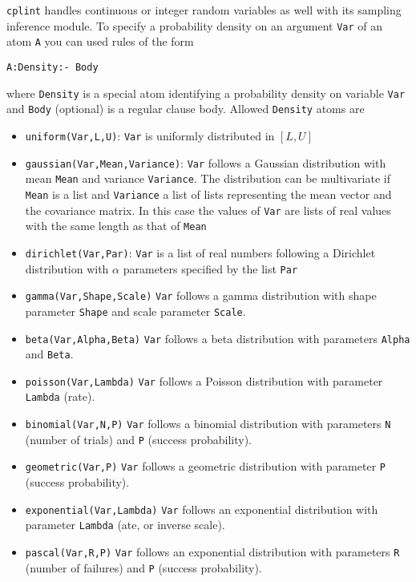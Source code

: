 \verb|cplint| handles continuous or integer random variables as well with its
sampling inference module.
To specify a probability density on an argument \verb|Var| of an atom
\verb|A| you can used rules of the form
\begin{verbatim}
A:Density:- Body
\end{verbatim}
where \verb|Density| is a special atom identifying a probability  density on variable \verb|Var| and \verb|Body| (optional) is a regular clause body.
Allowed \verb|Density| atoms are
\begin{itemize}
\item \verb|uniform(Var,L,U)|: \verb|Var| is uniformly distributed in $[L,U]$
\item \verb|gaussian(Var,Mean,Variance)|: \verb|Var| follows a Gaussian distribution with mean \verb|Mean| and variance \verb|Variance|. The distribution can be multivariate if \verb|Mean| 
is a list and \verb|Variance| a list of lists representing the mean vector and the covariance matrix. In this case the values of \verb|Var| are lists of real values with the same length as
that of \verb|Mean|
\item \verb|dirichlet(Var,Par)|: \verb|Var| is a list of real
numbers following a Dirichlet distribution with $\alpha$ parameters specified
by the list \verb|Par|
\item \verb|gamma(Var,Shape,Scale)|  \verb|Var| follows a gamma distribution 
with shape parameter \verb|Shape| and scale parameter \verb|Scale|.
\item \verb|beta(Var,Alpha,Beta)|  \verb|Var| follows a beta distribution 
with parameters \verb|Alpha| and \verb|Beta|.
\item \verb|poisson(Var,Lambda)|  \verb|Var| follows a Poisson distribution 
with parameter \verb|Lambda| (rate).
\item \verb|binomial(Var,N,P)|  \verb|Var| follows a binomial distribution 
with parameters \verb|N| (number of trials) and \verb|P| (success probability).
\item \verb|geometric(Var,P)|  \verb|Var| follows a geometric distribution 
with parameter \verb|P| (success probability).
\item \verb|exponential(Var,Lambda)|  \verb|Var| follows an exponential distribution 
with parameter \verb|Lambda| (ate, or inverse scale).
\item \verb|pascal(Var,R,P)|  \verb|Var| follows an exponential distribution 
with parameters \verb|R| (number of failures) and  \verb|P| (success probability).
\end{itemize}
